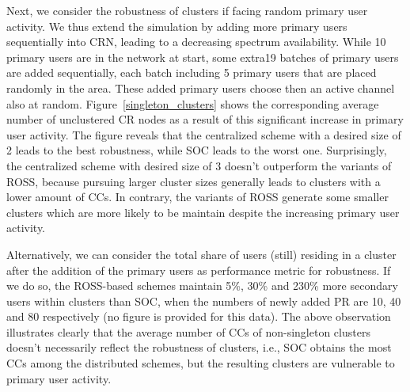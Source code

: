 \documentclass[times]{ettauth}
\newcommand{\ie}{i.e., }
\theoremstyle{mytheoremstyle}
\theoremstyle{mytheoremstyle}
\theoremstyle{mytheoremstyle}
\begin{document}
Next, we consider the robustness of clusters if facing random primary user activity.
We thus extend the simulation by adding more primary users sequentially into CRN, leading to a decreasing spectrum availability.
While 10 primary users are in the network at start, some extra19 batches of primary users are added sequentially, each batch including 5 primary users that are placed randomly in the area.
These added primary users choose then an active channel also at random. 
Figure~\ref{singleton_clusters} shows the corresponding average number of unclustered CR nodes as a result of this significant increase in primary user activity. 
The figure reveals that the centralized scheme with a desired size of 2 leads to the best robustness, while SOC leads to the worst one.
Surprisingly, the centralized scheme with desired size of 3 doesn't outperform the variants of ROSS, because pursuing larger cluster sizes generally leads to clusters with a lower amount of CCs. 
In contrary, the variants of ROSS generate some smaller clusters which are more likely to be maintain despite the increasing primary user activity.

Alternatively, we can consider the total share of users (still) residing in a cluster after the addition of the primary users as performance metric for robustness.
If we do so, the ROSS-based schemes maintain 5\%, 30\% and 230\% more secondary users within clusters than SOC, when the numbers of newly added PR are 10, 40 and 80 respectively (no figure is provided for this data).
The above observation illustrates clearly that the average number of CCs of non-singleton clusters doesn't necessarily reflect the robustness of clusters, \ie SOC obtains the most CCs among the distributed schemes, but the resulting clusters are vulnerable to primary user activity.
\end{document}
